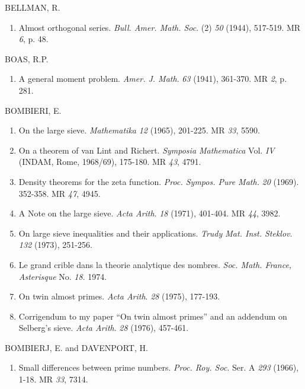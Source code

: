 \begin{thebibliography}{99}
 BELLMAN, R.
 \begin{enumerate}
\item Almost orthogonal series. \textit{Bull. Amer. Math. Soc}. (2)
  {\em 50} (1944), 517-519. MR {\em 6}, p. 48.
 \end{enumerate}
 
 BOAS, R.P.
 \begin{enumerate}
\item A general moment problem. \textit{Amer. J. Math}. {\em 63}
  (1941), 361-370. MR {\em 2}, p. 281.
 \end{enumerate} 
 
 BOMBIERI, E.
 \begin{enumerate}
\item On the large sieve. \textit{Mathematika} {\em 12} (1965),
  201-225. MR {\em 33}, 5590. 

\item On a theorem of van Lint and Richert. \textit{Symposia
  Mathematica} Vol. {\em IV} (INDAM, Rome, 1968/69), 175-180. MR {\em
  43}, 4791. 

\item Density theorems for the zeta
  function. \textit{Proc. Sympos. Pure Math.} {\em 20}
  (1969). 352-358. MR {\em 47}, 4945.

\item A Note on the large sieve. \textit{Acta Arith}. {\em 18} (1971),
  401-404. MR  {\em 44}, 3982. 

\item On large sieve inequalities and their
  applications. \textit{Trudy Mat. Inst. Steklov}. {\em 132} (1973),
  251-256.   

\item Le grand crible dans la theorie analytique des
  nombres. \textit{Soc. Math. France, Asterisque} No. {\em 18}. 1974.  

\item On twin almost primes. \textit{Acta Arith}. {\em 28} (1975),
  177-193. 

\item Corrigendum to my paper ``On twin almost primes'' and an
  addendum on Selberg's sieve. \textit{Acta Arith}. {\em 28} (1976),
  457-461.  
 \end{enumerate}
 
 BOMBIERJ, E. and DAVENPORT, H.
\begin{enumerate}
\item Small differences between prime
  numbers. \textit{Proc. Roy. Soc}. Ser. A {\em 293} (1966), 1-18. MR
  {\em 33}, 7314. 


\end{enumerate}
\end{thebibliography}
